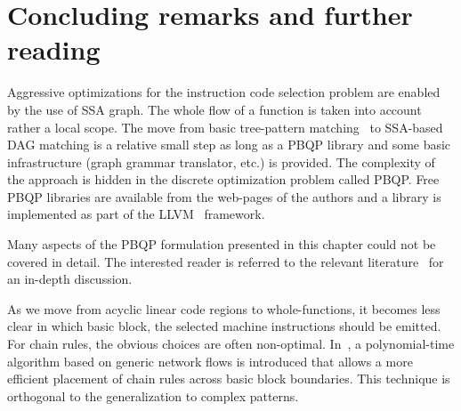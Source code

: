 
\section{Concluding remarks and further reading}
Aggressive optimizations for the instruction code selection problem are enabled by the use of SSA graph.
The whole flow of a function is taken into account
rather a local scope. The move from basic tree-pattern
matching~\cite{aj:76} to SSA-based DAG matching is a relative small
step as long as a PBQP library and some basic infrastructure (graph
grammar translator, etc.)  is provided. The complexity of the approach
is hidden in the discrete optimization problem called PBQP. Free PBQP
libraries are available from the web-pages of the authors and a
library is implemented as part of the LLVM~\cite{wwwLLVM} framework.

Many aspects of the PBQP formulation presented in this chapter could
not be covered in detail. The interested reader is referred to the
relevant literature~\cite{EcksteinKS03,Ebner08} for an in-depth
discussion.

As we move from acyclic linear code regions to whole-functions, it
becomes less clear in which basic block, the selected machine
instructions should be emitted. For chain rules, the obvious choices
are often non-optimal. In~\cite{1269857}, a polynomial-time algorithm
based on generic network flows is introduced that allows a more
efficient placement of chain rules across basic block boundaries. This
technique is orthogonal to the generalization to complex patterns.

